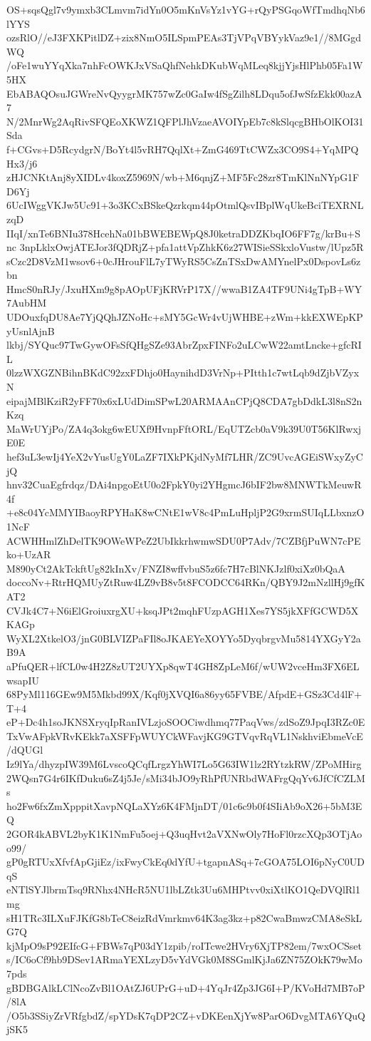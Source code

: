 OS+sqsQgl7v9ymxb3CLmvm7idYn0O5mKnVsYz1vYG+rQyPSGqoWfTmdhqNb6lYYS
ozsRlO//eJ3FXKPitlDZ+zix8NmO5ILSpmPEAs3TjVPqVBYykVaz9e1//8MGgdWQ
/oFe1wuYYqXka7nhFcOWKJxVSaQhfNehkDKubWqMLeq8kjjYjsHlPhb05Fa1W5HX
EbABAQOsuJGWreNvQyygrMK757wZc0GaIw4fSgZilh8LDqu5ofJwSfzEkk00azA7
N/2MnrWg2AqRivSFQEoXKWZ1QFPlJhVzaeAVOIYpEb7c8kSlqcgBHbOlKOI31Sda
f+CGvs+D5RcydgrN/BoYt4l5vRH7QqlXt+ZmG469TtCWZx3CO9S4+YqMPQHx3/j6
zHJCNKtAnj8yXIDLv4koxZ5969N/wb+M6qnjZ+MF5Fc28zr8TmKlNnNYpG1FD6Yj
6UcIWggVKJw5Uc91+3o3KCxBSkeQzrkqm44pOtmlQsvIBplWqUkeBciTEXRNLzqD
IIqI/xnTe6BNIu378HcehNa01bBWEBEWpQ8J0ketraDDZKbqIO6FF7g/krBu+Snc
3npLklxOwjATEJor3fQDRjZ+pfa1attVpZhkK6z27WISieSSkxloVustw/lUpz5R
sCzc2D8VzM1wsov6+0cJHrouFlL7yTWyRS5CsZnTSxDwAMYnelPx0DspovLs6zbn
HmcS0nRJy/JxuHXm9g8pAOpUFjKRVrP17X//wwaB1ZA4TF9UNi4gTpB+WY7AubHM
UDOuxfqDU8Ae7YjQQhJZNoHc+sMY5GcWr4vUjWHBE+zWm+kkEXWEpKPyUsnlAjnB
lkbj/SYQuc97TwGywOFsSfQHgSZe93AbrZpxFINFo2uLCwW22amtLncke+gfcRIL
0lzzWXGZNBihnBKdC92zxFDhjo0HaynihdD3VrNp+PItth1c7wtLqb9dZjbVZyxN
eipajMBlKziR2yFF70x6xLUdDimSPwL20ARMAAnCPjQ8CDA7gbDdkL3l8nS2nKzq
MaWrUYjPo/ZA4q3okg6wEUXf9HvnpFftORL/EqUTZcb0aV9k39U0T56KlRwxjE0E
hef3uL3ewIj4YeX2vYusUgY0LaZF7IXkPKjdNyMf7LHR/ZC9UvcAGEiSWxyZyCjQ
hnv32CuaEgfrdqz/DAi4npgoEtU0o2FpkY0yi2YHgmcJ6bIF2bw8MNWTkMeuwR4f
+e8c04YcMMYIBaoyRPYHaK8wCNtE1wV8c4PmLuHpljP2G9xrmSUIqLLbxnzO1NcF
ACWHHmlZhDelTK9OWeWPeZ2UbIkkrhwmwSDU0P7Adv/7CZBfjPuWN7cPEko+UzAR
M890yCt2AkTckftUg82kInXv/FNZI8wffvbuS5z6fc7H7cBlNKJzlf0xiXz0bQaA
doccoNv+RtrHQMUyZtRuw4LZ9vB8v5t8FCODCC64RKn/QBY9J2mNzllHj9gfKAT2
CVJk4C7+N6iElGroiuxrgXU+ksqJPt2mqhFUzpAGH1Xes7YS5jkXFfGCWD5XKAGp
WyXL2XtkelO3/jnG0BLVIZPaFIl8oJKAEYeXOYYo5DyqbrgvMu5814YXGyY2aB9A
aPfuQER+lfCL0w4H2Z8zUT2UYXp8qwT4GH8ZpLeM6f/wUW2vceHm3FX6ELwsapIU
68PyMl116GEw9M5Mkbd99X/Kqf0jXVQI6a86yy65FVBE/AfpdE+GSz3Cd4lF+T+4
eP+Dc4h1soJKNSXryqIpRanIVLzjoSOOCiwdhmq77PaqVws/zdSoZ9JpqI3RZc0E
TxVwAFpkVRvKEkk7aXSFFpWUYCkWFavjKG9GTVqvRqVL1NskhviEbmeVcE/dQUGl
Iz9lYa/dhyzpIW39M6LvscoQCqfLrgzYhWI7Lo5G63IW1lz2RYtzkRW/ZPoMHirg
2WQsn7G4r6IKfDuku6sZ4j5Je/sMi34bJO9yRhPfUNRbdWAFrgQqYv6JfCfCZLMs
ho2Fw6fxZmXpppitXavpNQLaXYz6K4FMjnDT/01c6c9b0f4SIiAb9oX26+5bM3EQ
2GOR4kABVL2byK1K1NmFu5oej+Q3uqHvt2aVXNwOly7HoFl0rzcXQp3OTjAoo99/
gP0gRTUxXfvfApGjiEz/ixFwyCkEq0dYfU+tgapnASq+7cGOA75LOI6pNyC0UDqS
eNTlSYJlbrmTsq9RNhx4NHcR5NU1lbLZtk3Uu6MHPtvv0xiXtlKO1QeDVQlRl1mg
sH1TRc3ILXuFJKfG8bTeC8eizRdVmrkmv64K3ag3kz+p82CwaBmwzCMA8eSkLG7Q
kjMpO9sP92EIfcG+FBWs7qP03dY1zpib/roITcwe2HVry6XjTP82em/7wxOCSset
s/IC6oCf9hb9DSev1ARmaYEXLzyD5vYdVGk0M8SGmlKjJa6ZN75ZOkK79wMo7pds
gBDBGAlkLClNcoZvBl1OAtZJ6UPrG+uD+4YqJr4Zp3JG6I+P/KVoHd7MB7oP/8lA
/O5b3SSiyZrVRfgbdZ/spYDsK7qDP2CZ+vDKEenXjYw8ParO6DvgMTA6YQuQjSK5

